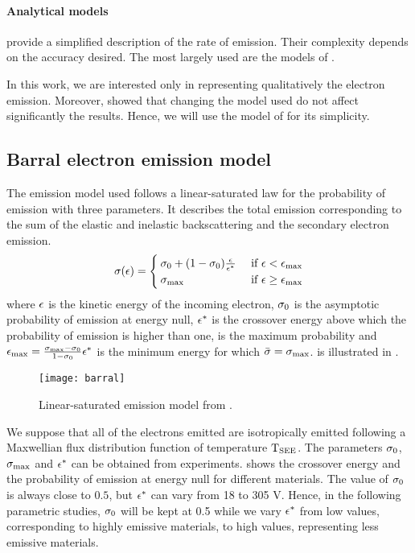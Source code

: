 \paragraph{Analytical models} provide a simplified description of the rate of emission.
Their complexity depends on the accuracy desired.
The most largely used are the models of \citet{vaughan1989,barral2003a,sydorenko2006b}.

In this work, we are interested only in representing qualitatively the electron emission.
Moreover, \citet{croes2017} showed that changing the model used do not affect significantly the results. 
Hence, we will use the model of \citet{barral2003a} for its simplicity.

\subsection{Barral electron emission model}
\label{sec-modelused}

The emission model used follows a linear-saturated law for the probability of emission with three parameters. 
It describes the total emission corresponding to the sum of the elastic and inelastic backscattering and the secondary electron emission.
\begin{equation} \label{eq-proba_barral}
  \sigma (\epsilon) = 
  \begin{cases}
    \sigma _0 + (1 - \sigma _0) \frac{\epsilon}{\epsilon^{*}}   &\text{ if } \epsilon <  \epsilon_{\max} \\
    \sigma _{\rm max}  &\text{ if } \epsilon \geq \epsilon_{\max}
  \end{cases}
\end{equation}
where $\epsilon$ is the kinetic energy of the incoming electron, $\sigma _0$ is the asymptotic probability of emission at energy null, $\epsilon^{*}$ is the crossover energy above which the probability of emission is higher than one, \probamax is the maximum probability and $\epsilon_{\max}= \frac{\sigma _{\rm max}  - \sigma _0}{1 - \sigma _0} \epsilon^{*} $ is the minimum energy for which $ \bar{\sigma } = \sigma _{\rm max} $.
 is illustrated in .

\begin{figure}[hbt]
  \centering
  \texttt{[image: barral]}
  \caption{Linear-saturated emission model from \citet{barral2003a}.}
  \label{fig-modelbarral}
\end{figure}

 We suppose that all of the electrons emitted are isotropically emitted following a Maxwellian flux distribution function of temperature $\mathrm{T_{SEE}}$.
 The parameters $\sigma _0$,  $\sigma _{\rm max} $ and $\epsilon^{*}$ can be obtained from experiments. 
  shows the crossover energy and the  probability of emission at energy null for different materials.
 The value of $\sigma _0$ is always close to $0.5$, but $\epsilon^{*}$ can vary from 18 to 305 V.
 Hence, in the following parametric studies, $\sigma _0$ will be kept at 0.5 while we vary $\epsilon^{*}$ from low values, corresponding to highly emissive materials, to high values, representing less emissive materials.
 
